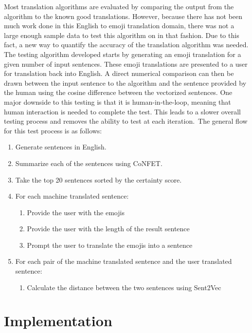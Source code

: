 \documentclass{article}[10]
\begin{document}
Most translation algorithms are evaluated by comparing the output from
the algorithm to the known good translations. However, because there has
not been much work done in this English to emoji translation domain,
there was not a large enough sample data to test this algorithm on in
that fashion. Due to this fact, a new way to quantify the accuracy of
the translation algorithm was needed. The testing algorithm developed
starts by generating an emoji translation for a given number of input
sentences. These emoji translations are presented to a user for
translation back into English. A direct numerical comparison can then be
drawn between the input sentence to the algorithm and the sentence
provided by the human using the cosine difference between the vectorized
sentences. One major downside to this testing is that it is
human-in-the-loop, meaning that human interaction is needed to complete
the test. This leads to a slower overall testing process and removes the
ability to test at each iteration.~The general flow for this test
process is as follows:

\begin{enumerate}
\item
  Generate sentences in English.
\item
  Summarize each of the sentences using CoNFET.
\item
  Take the top 20 sentences sorted by the certainty score.
\item
  {For each machine translated sentence:}
    \begin{enumerate}
        \item
          {Provide the user with the emojis}
        \item
          {Provide the user with the length of the result sentence }
        \item
          {Prompt the user to translate the emojis into a sentence}
    \end{enumerate}
\item
  {For each pair of the machine translated sentence and the user
  translated sentence:}
    \begin{enumerate}
      \item
        {Calculate the distance between the two sentences using Sent2Vec}
    \end{enumerate}
\end{enumerate}

\section{Implementation\label{sec:implementation}}
\end{document}
